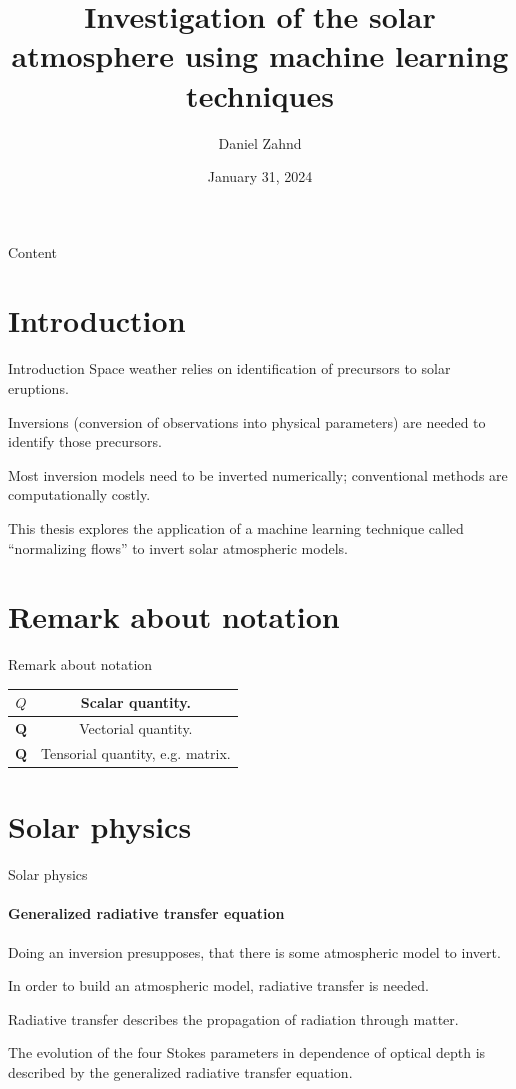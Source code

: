 \documentclass{beamer}
\title{Investigation of the solar atmosphere using machine learning techniques}
\author{Daniel Zahnd}
\date{January 31, 2024}
\newcommand\matr[1]{\ensuremath{\boldsymbol{\mathbf{#1}}}}
\newcommand\vect[1]{\ensuremath{\bm{#1}}}
\begin{document}
\begin{frame}
\maketitle
\end{frame}
\setcounter{framenumber}{0}

\setlength{\parskip}{2pt}
\begin{frame}{Content}
\tableofcontents
\end{frame}
\setlength{\parskip}{8pt}
\section{Introduction}
\begin{frame}[allowframebreaks]{Introduction}
Space weather relies on identification of precursors to solar eruptions.

Inversions (conversion of observations into physical parameters) are needed to identify those precursors.

Most inversion models need to be inverted numerically; conventional methods are computationally costly.

This thesis explores the application of a machine learning technique called ``normalizing flows'' to invert solar atmospheric models.
\end{frame}

\section*{Remark about notation}
\begin{frame}[allowframebreaks]{Remark about notation}
\begin{table}
\centering
\begin{tabular}{|c|c|}
\hline
$Q$ & Scalar quantity. \\
\hline
$\vect{Q}$ & Vectorial quantity. \\
\hline
$\matr{Q}$ & Tensorial quantity, e.g. matrix. \\
\hline
\end{tabular}
\end{table}
\end{frame}

\section{Solar physics}
\begin{frame}[allowframebreaks]{Solar physics}
	\framesubtitle{Generalized radiative transfer equation}
Doing an inversion presupposes, that there is some atmospheric model to invert.

In order to build an atmospheric model, radiative transfer is needed.
	
Radiative transfer describes the propagation of radiation through matter.

The evolution of the four Stokes parameters in dependence of optical depth is described by the generalized radiative transfer equation.
\end{frame}
\end{document}
